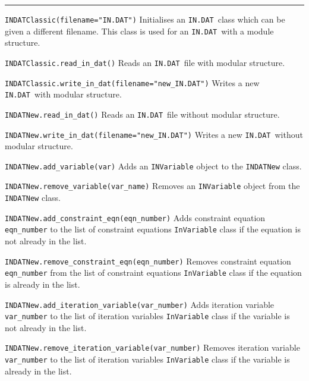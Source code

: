 \documentclass[11pt,a4paper]{article}
\newcommand{\indat}{\mbox{\texttt{IN.DAT}}}
\begin{document}
\rule{\textwidth}{0.4pt}

\begin{description}

\item{\verb|INDATClassic(filename="IN.DAT")| } Initialises an \indat\ class
  which can be given a different filename. This class is used for an \indat\
  with a module structure.

\item{\verb|INDATClassic.read_in_dat()| } Reads an \indat\ file with modular
  structure.

\item{\verb|INDATClassic.write_in_dat(filename="new_IN.DAT")| } Writes a new
  \indat\ with modular structure.

\item{\verb|INDATNew.read_in_dat()| } Reads an \indat\ file without modular
  structure.

\item{\verb|INDATNew.write_in_dat(filename="new_IN.DAT")| } Writes a new
  \indat\ without modular structure.

\item{\verb|INDATNew.add_variable(var)| } Adds an \verb|INVariable| object to
  the \verb|INDATNew| class.

\item{\verb|INDATNew.remove_variable(var_name)| } Removes an
  \verb|INVariable| object from the \verb|INDATNew| class.

\item{\verb|INDATNew.add_constraint_eqn(eqn_number)|} Adds constraint
  equation \verb|eqn_number| to the list of constraint equations
  \verb|InVariable| class if the equation is not already in the list.

\item{\verb|INDATNew.remove_constraint_eqn(eqn_number)|} Removes
  constraint equation \verb|eqn_number| from the list of constraint
  equations \verb|InVariable| class if the equation is already in the list.

\item{\verb|INDATNew.add_iteration_variable(var_number)| } Adds iteration
  variable \verb|var_number| to the list of iteration variables
  \verb|InVariable| class if the variable is not already in the list.

\item{\verb|INDATNew.remove_iteration_variable(var_number)| } Removes
  iteration variable \verb|var_number| to the list of iteration variables
  \verb|InVariable| class if the variable is already in the list.

\end{description}
\end{document}
